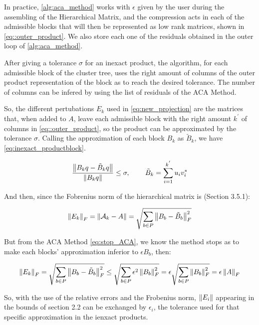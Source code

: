 In practice, \ref{alg:aca_method} works with $\epsilon$ given by the user during the assembling of the Hierarchical Matrix, and the compression acts in each of the admissible blocks that will then be represented as low rank matrices, shown in \ref{eq::outer_product}. We also store each one of the residuals obtained in the outer loop of \ref{alg:aca_method}.

After giving a tolerance $\sigma$ for an inexact product, the algorithm, for each admissible block of the cluster tree, uses the right amount of columns of the outer product representation of the block as to reach the desired tolerance. The number of columns can be infered by using the list of residuals of the ACA Method.

So, the different pertubations $E_{k}$ used in \ref{eq:new_projection} are the matrices that, when added to $A$, leave each admissible block with the right amount $k^{'}$ of columns in \ref{eq::outer_product}, so the product can be approximated by the tolerance $\sigma$. Calling the approximation of each block $B_{k}$ as $\tilde{B}_{k}$, we have \ref{eq:inexact_productblock}.

\begin{equation}\label{eq:inexact_productblock}
    \frac{\left\lVert B_{k}q - \tilde{B}_{k}q \right\rVert}{\left\lVert B_{k}q\right\rVert} \leq \sigma, \hspace{0.3in} \tilde{B}_{k} = \sum_{i=1} ^{k^{'}} u_{i} v_{i} ^{*}
\end{equation}


And then, since the Fobrenius norm of the hierarchical matrix is \cite{hackbusch2015hierarchical}(Section 3.5.1):

\begin{equation}
    \left\lVert E_{k}\right\rVert_{F}= \left\lVert\mathcal{A}_{k} - A\right\rVert = \sqrt{\sum_{b \in P} \left\lVert B_{b} - \tilde{B}_{b}\right\rVert_{F}^{2} }
\end{equation}

But from the ACA Method \ref{eq:stop_ACA}, we know the method stops as to make each blocks' approximation inferior to $\epsilon B_{b}$, then:

\begin{equation}
    \left\lVert E_{k}\right\rVert_{F} = \sqrt{\sum_{b \in P} \left\lVert B_{b} - \tilde{B}_{b}\right\rVert_{F}^{2} } \leq \sqrt{\sum_{b\in P}\epsilon^{2}\left\lVert B_{b}\right\rVert_{F}^{2}} = \epsilon \sqrt{\sum_{b \in P}\left\lVert B_{b}\right\rVert_{F}^{2}}
    = \epsilon \left\lVert A\right\rVert_{F}
\end{equation}

So, with the use of the relative errors and the Frobenius norm, $\left\lVert E_{i}\right\rVert$ appearing in the bounds of section 2.2 can be exchanged by $\epsilon_{i}$, the tolerance used for that specific approximation in the ienxact products.